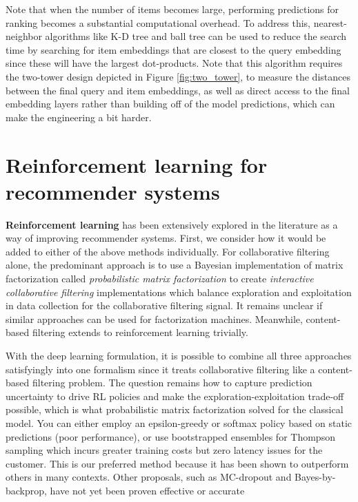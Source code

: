 \documentclass{article}
\begin{document}
Note that when the number of items becomes large, performing predictions for ranking becomes a substantial computational overhead. To address this, nearest-neighbor algorithms\cite{nearest_neighbors} like K-D tree and ball tree can be used to reduce the search time by searching for item embeddings that are closest to the query embedding since these will have the largest dot-products. Note that this algorithm requires the two-tower design depicted in Figure \ref{fig:two_tower}, to measure the distances between the final query and item embeddings, as well as direct access to the final embedding layers rather than building off of the model predictions, which can make the engineering a bit harder.

\section{Reinforcement learning for recommender systems}

\textbf{Reinforcement learning} has been extensively explored in the literature as a way of improving recommender systems\cite{rl_recsy, rl_recsys2, rl_recsys3}. First, we consider how it would be added to either of the above methods individually. For collaborative filtering alone, the predominant approach is to use a Bayesian implementation of matrix factorization called \textit{probabilistic matrix factorization}\cite{PMF_probabilistic_matrix_factorization,BPMF_bayesian_probabilistic_matrix_factorization} to create \textit{interactive collaborative filtering}\cite{interactive_CF,interactive_CF2,interactive_CF3} implementations which balance exploration and exploitation in data collection for the collaborative filtering signal. It remains unclear if similar approaches can be used for factorization machines. Meanwhile, content-based filtering extends to reinforcement learning trivially. 

With the deep learning formulation, it is possible to combine all three approaches satisfyingly into one formalism since it treats collaborative filtering like a content-based filtering problem. The question remains how to capture prediction uncertainty to drive RL policies and make the exploration-exploitation trade-off possible, which is what probabilistic matrix factorization solved for the classical model. You can either employ an epsilon-greedy or softmax policy based on static predictions (poor performance), or use bootstrapped ensembles for Thompson sampling\cite{randomized_prior_functions, bootstrap_DQN, thompson_sampling} which incurs greater training costs but zero latency issues for the customer. This is our preferred method because it has been shown to outperform others in many contexts\cite{thompson_sampling1, thompson_sampling2, thompson_sampling3}. Other proposals, such as MC-dropout\cite{monte_carlo_dropout} and Bayes-by-backprop\cite{bayes_by_backprop}, have not yet been proven effective or accurate\cite{risk_versus_uncertainty}
\end{document}
